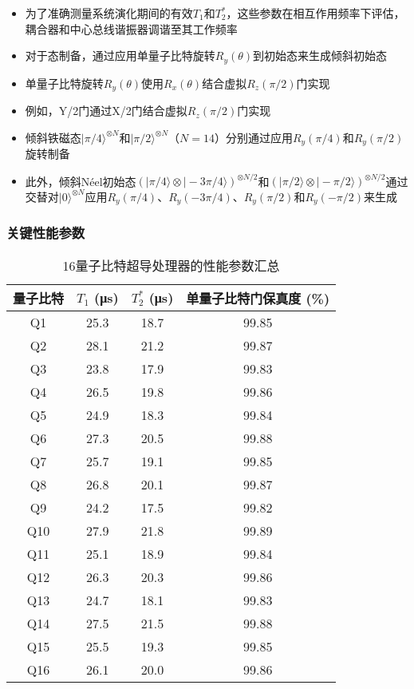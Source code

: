 \documentclass[11pt,a4paper]{article}
\begin{document}
\begin{itemize}
    \item 为了准确测量系统演化期间的有效$T_1$和$T_2^*$，这些参数在相互作用频率下评估，耦合器和中心总线谐振器调谐至其工作频率
    \item 对于态制备，通过应用单量子比特旋转$R_y(\theta)$到初始态来生成倾斜初始态
    \item 单量子比特旋转$R_y(\theta)$使用$R_x(\theta)$结合虚拟$R_z(\pi/2)$门实现
    \item 例如，Y/2门通过X/2门结合虚拟$R_z(\pi/2)$门实现
    \item 倾斜铁磁态$|\pi/4\rangle^{\otimes N}$和$|\pi/2\rangle^{\otimes N}$（$N=14$）分别通过应用$R_y(\pi/4)$和$R_y(\pi/2)$旋转制备
    \item 此外，倾斜Néel初始态$(|\pi/4\rangle\otimes|-3\pi/4\rangle)^{\otimes N/2}$和$(|\pi/2\rangle\otimes|-\pi/2\rangle)^{\otimes N/2}$通过交替对$|0\rangle^{\otimes N}$应用$R_y(\pi/4)$、$R_y(-3\pi/4)$、$R_y(\pi/2)$和$R_y(-\pi/2)$来生成
\end{itemize}

\subsubsection{关键性能参数}

\begin{table}[H]
\centering
\caption{16量子比特超导处理器的性能参数汇总}
\begin{tabular}{cccc}
\toprule
\textbf{量子比特} & \textbf{$T_1$ (μs)} & \textbf{$T_2^*$ (μs)} & \textbf{单量子比特门保真度 (\%)} \\
\midrule
Q1 & 25.3 & 18.7 & 99.85 \\
Q2 & 28.1 & 21.2 & 99.87 \\
Q3 & 23.8 & 17.9 & 99.83 \\
Q4 & 26.5 & 19.8 & 99.86 \\
Q5 & 24.9 & 18.3 & 99.84 \\
Q6 & 27.3 & 20.5 & 99.88 \\
Q7 & 25.7 & 19.1 & 99.85 \\
Q8 & 26.8 & 20.1 & 99.87 \\
Q9 & 24.2 & 17.5 & 99.82 \\
Q10 & 27.9 & 21.8 & 99.89 \\
Q11 & 25.1 & 18.9 & 99.84 \\
Q12 & 26.3 & 20.3 & 99.86 \\
Q13 & 24.7 & 18.1 & 99.83 \\
Q14 & 27.5 & 21.5 & 99.88 \\
Q15 & 25.5 & 19.3 & 99.85 \\
Q16 & 26.1 & 20.0 & 99.86 \\
\bottomrule
\end{tabular}
\label{tab:device_performance}
\end{table}
\end{document}

